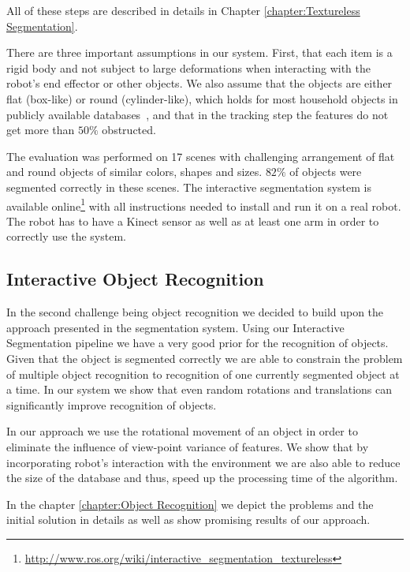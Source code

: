 All of these steps are described in details in Chapter \ref{chapter:Textureless Segmentation}. 


There are three important assumptions in our system. First, that each item is a rigid  body and not subject
to large deformations when  interacting with  the robot's  end  effector or
other objects. We also assume that the objects are either flat (box-like) or round (cylinder-like),
which holds for most household objects in publicly available databases~\cite{marton11ijrr}, and
that in the tracking step the features do not get more than $50\%$ obstructed.

The evaluation was performed on 17 scenes with challenging arrangement of flat and
round objects of similar colors, shapes and sizes. $82\%$ of objects
were segmented correctly in these scenes. The interactive segmentation system is available online\footnote{\url{http://www.ros.org/wiki/interactive_segmentation_textureless}} with all instructions needed to install and run it on a real robot. The robot has to have a Kinect sensor as well as at least one arm in order to correctly use the system.

\subsection{Interactive Object Recognition} 

In the second challenge being object recognition we decided to build upon the approach presented in the segmentation system. Using our Interactive Segmentation pipeline we have a very good prior for the recognition of objects. Given that the object is segmented correctly we are able to constrain the problem of multiple object recognition to recognition of one currently segmented object at a time. In our system we show that even random rotations and translations can significantly improve recognition of objects.

In our approach we use the rotational movement of an object in order to eliminate the influence of view-point variance of features. We show that by incorporating robot's interaction with the environment we are also able to reduce the size of the database and thus, speed up the processing time of the algorithm.

In the chapter \ref{chapter:Object Recognition} we depict the problems and the initial solution in details as well as show promising results of our approach.
    















